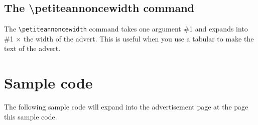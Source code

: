 \documentclass{article}
\begin{document}
\subsection{The \textbackslash petiteannoncewidth command}

The \verb!\petiteannoncewidth! command takes one argument \#1 and expands into
\#1 \(\times\) the width of the advert. This is useful when you use a tabular
to make the text of the advert.

\section{Sample code}

The following sample code will expand into the advertisement page at the page
this sample code.






\end{document}

